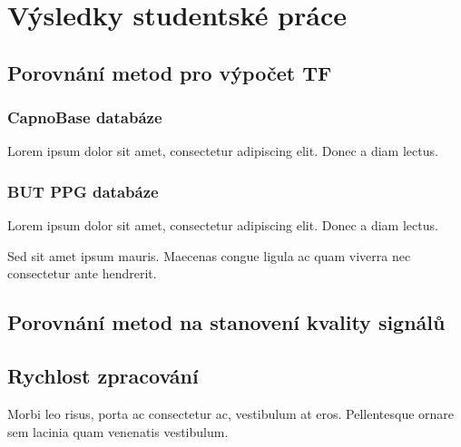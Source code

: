 \chapter{Výsledky studentské práce}
\label{ch:Vysledky}

\section{Porovnání metod pro výpočet TF}
\label{sec:porovnani_metod_tf}

\subsection*{CapnoBase databáze}

Lorem ipsum dolor sit amet, consectetur adipiscing elit.
Donec a diam lectus.

\subsection*{BUT PPG databáze}

Lorem ipsum dolor sit amet, consectetur adipiscing elit.
Donec a diam lectus.

Sed sit amet ipsum mauris.
Maecenas congue ligula ac quam viverra nec consectetur ante hendrerit.

\section{Porovnání metod na stanovení kvality signálů}

\section{Rychlost zpracování}
\label{sec:rychlost_zpracovani}

Morbi leo risus, porta ac consectetur ac, vestibulum at eros.
Pellentesque ornare sem lacinia quam venenatis vestibulum.